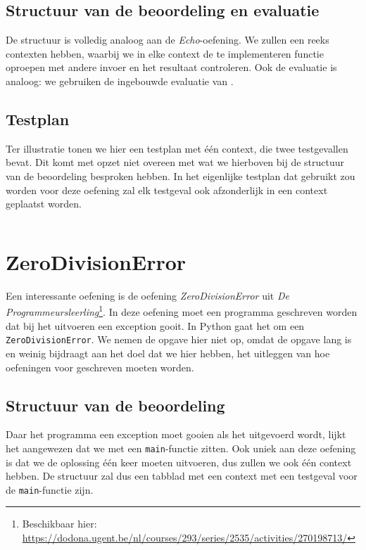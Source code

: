 \subsection{Structuur van de beoordeling en evaluatie}\label{subsec:oefening-echofunctie-structuur}

De structuur is volledig analoog aan de \emph{Echo}-oefening.
We zullen een reeks contexten hebben, waarbij we in elke context de te implementeren functie oproepen met andere invoer en het resultaat controleren.
Ook de evaluatie is analoog: we gebruiken de ingebouwde evaluatie van \tested{}.

\subsection{Testplan}\label{subsec:oefening-echofunctie-testplan}

Ter illustratie tonen we hier een testplan met één context, die twee testgevallen bevat.
Dit komt met opzet niet overeen met wat we hierboven bij de structuur van de beoordeling besproken hebben.
In het eigenlijke testplan dat gebruikt zou worden voor deze oefening zal elk testgeval ook afzonderlijk in een context geplaatst worden.

\inputminted{json}{sources/echo-function/one-testcase.tson}

\section{ZeroDivisionError}\label{sec:oefening-zero}

Een interessante oefening is de oefening \emph{ZeroDivisionError} uit \emph{De Programmeursleerling}\footnote{Beschikbaar hier: \url{https://dodona.ugent.be/nl/courses/293/series/2535/activities/270198713/}}.
In deze oefening moet een programma geschreven worden dat bij het uitvoeren een exception gooit.
In Python gaat het om een \texttt{ZeroDivisionError}.
We nemen de opgave hier niet op, omdat de opgave lang is en weinig bijdraagt aan het doel dat we hier hebben, het uitleggen van hoe oefeningen voor \tested{} geschreven moeten worden.

\subsection{Structuur van de beoordeling}\label{subsec:oefening-zero-structuur}

Daar het programma een exception moet gooien als het uitgevoerd wordt, lijkt het aangewezen dat we met een \texttt{main}-functie zitten.
Ook uniek aan deze oefening is dat we de oplossing één keer moeten uitvoeren, dus zullen we ook één context hebben.
De structuur zal dus een tabblad met een context met een testgeval voor de \texttt{main}-functie zijn.

